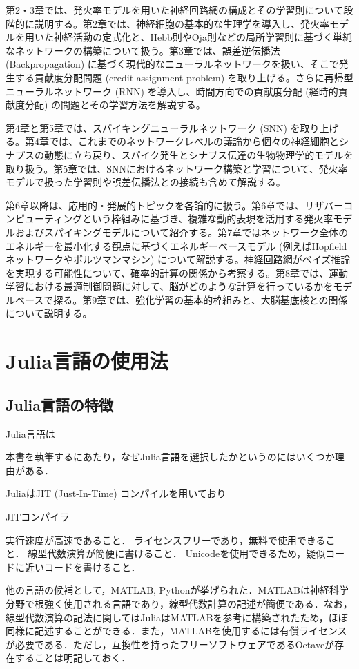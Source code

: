 \documentclass[titlepage]{ltjsbook}
\begin{document}
第2・3章では、発火率モデルを用いた神経回路網の構成とその学習則について段階的に説明する。第2章では、神経細胞の基本的な生理学を導入し、発火率モデルを用いた神経活動の定式化と、Hebb則やOja則などの局所学習則に基づく単純なネットワークの構築について扱う。第3章では、誤差逆伝播法 (Backpropagation) に基づく現代的なニューラルネットワークを扱い、そこで発生する貢献度分配問題 (credit assignment problem) を取り上げる。さらに再帰型ニューラルネットワーク (RNN) を導入し、時間方向での貢献度分配 (経時的貢献度分配) の問題とその学習方法を解説する。

第4章と第5章では、スパイキングニューラルネットワーク (SNN) を取り上げる。第4章では、これまでのネットワークレベルの議論から個々の神経細胞とシナプスの動態に立ち戻り、スパイク発生とシナプス伝達の生物物理学的モデルを取り扱う。第5章では、SNNにおけるネットワーク構築と学習について、発火率モデルで扱った学習則や誤差伝播法との接続も含めて解説する。

第6章以降は、応用的・発展的トピックを各論的に扱う。第6章では、リザバーコンピューティングという枠組みに基づき、複雑な動的表現を活用する発火率モデルおよびスパイキングモデルについて紹介する。第7章ではネットワーク全体のエネルギーを最小化する観点に基づくエネルギーベースモデル (例えばHopfieldネットワークやボルツマンマシン) について解説する。神経回路網がベイズ推論を実現する可能性について、確率的計算の関係から考察する。第8章では、運動学習における最適制御問題に対して、脳がどのような計算を行っているかをモデルベースで探る。第9章では、強化学習の基本的枠組みと、大脳基底核との関係について説明する。

\section{Julia言語の使用法}
\subsection{Julia言語の特徴}
Julia言語は

本書を執筆するにあたり，なぜJulia言語を選択したかというのにはいくつか理由がある．

JuliaはJIT (Just-In-Time) コンパイルを用いており

JITコンパイラ

実行速度が高速であること．
ライセンスフリーであり，無料で使用できること．
線型代数演算が簡便に書けること．
Unicodeを使用できるため，疑似コードに近いコードを書けること．

他の言語の候補として，MATLAB, Pythonが挙げられた．MATLABは神経科学分野で根強く使用される言語であり，線型代数計算の記述が簡便である．なお，線型代数演算の記法に関してはJuliaはMATLABを参考に構築されたため，ほぼ同様に記述することができる．また，MATLABを使用するには有償ライセンスが必要である．ただし，互換性を持ったフリーソフトウェアであるOctaveが存在することは明記しておく．
\end{document}
